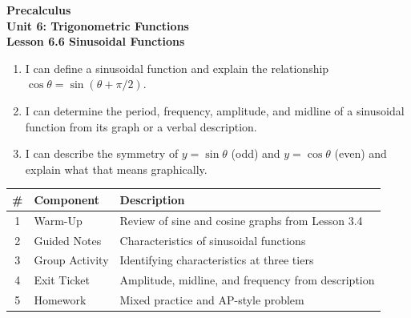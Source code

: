 \documentclass[10pt]{article}
\begin{document}
\vspace{-0.8in}

\begin{center}
  {\color{white}\textbf{\LARGE Precalculus}}\\[4pt]
  {\color{skymid}\large\textbf{Unit 6: Trigonometric Functions}}\\[6pt]
  {\color{white}\textbf{\large Lesson 6.6 \quad Sinusoidal Functions}}
\end{center}

\vspace{0.22in}
\namedateperiod
\vspace{0.18in}

\begin{learningtargetbox}
\small
\begin{enumerate}[leftmargin=1.5em, itemsep=5pt]
  \item I can define a sinusoidal function and explain the relationship
        $\cos\theta = \sin(\theta + \pi/2)$.
  \item I can determine the period, frequency, amplitude, and midline of a
        sinusoidal function from its graph or a verbal description.
  \item I can describe the symmetry of $y = \sin\theta$ (odd) and $y = \cos\theta$
        (even) and explain what that means graphically.
\end{enumerate}
\end{learningtargetbox}

\vspace{0.14in}

\begin{tocbox}
\small
\renewcommand{\arraystretch}{1.5}
\begin{tabularx}{\linewidth}{@{} c l X @{}}
\rowcolor{sky}
\textbf{\#} & \textbf{Component} & \textbf{Description} \\
\midrule
1 & Warm-Up        & Review of sine and cosine graphs from Lesson 3.4 \\
2 & Guided Notes   & Characteristics of sinusoidal functions \\
3 & Group Activity & Identifying characteristics at three tiers \\
4 & Exit Ticket    & Amplitude, midline, and frequency from description \\
5 & Homework       & Mixed practice and AP-style problem \\
\end{tabularx}
\end{tocbox}
\end{document}
